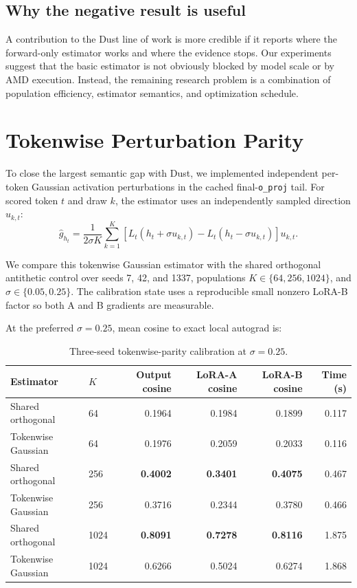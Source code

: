 \documentclass[11pt]{article}
\newcommand{\oproj}{\texttt{o\_proj}}
\begin{document}
\subsection{Why the negative result is useful}

A contribution to the Dust line of work is more credible if it reports where
the forward-only estimator works and where the evidence stops. Our experiments
suggest that the basic estimator is not obviously blocked by model scale or
by AMD execution. Instead, the remaining research problem is a combination of
population efficiency, estimator semantics, and optimization schedule.

\section{Tokenwise Perturbation Parity}

To close the largest semantic gap with Dust, we implemented independent
per-token Gaussian activation perturbations in the cached final-\oproj{} tail.
For scored token $t$ and draw $k$, the estimator uses an independently sampled
direction $u_{k,t}$:
\begin{equation}
\hat g_{h_t} =
\frac{1}{2\sigma K}
\sum_{k=1}^{K}
\left[
L_t(h_t+\sigma u_{k,t})-
L_t(h_t-\sigma u_{k,t})
\right]u_{k,t}.
\end{equation}

We compare this tokenwise Gaussian estimator with the shared orthogonal
antithetic control over seeds 7, 42, and 1337, populations
$K\in\{64,256,1024\}$, and $\sigma\in\{0.05,0.25\}$. The calibration
state uses a reproducible small nonzero LoRA-B factor so both A and B gradients
are measurable.

At the preferred $\sigma=0.25$, mean cosine to exact local autograd is:

\begin{table}[t]
\centering
\caption{Three-seed tokenwise-parity calibration at $\sigma=0.25$.}
\label{tab:tokenwise}
\begin{tabular}{llrrrr}
\toprule
Estimator & $K$ & Output cosine & LoRA-A cosine & LoRA-B cosine & Time (s) \\
\midrule
Shared orthogonal & 64   & 0.1964 & 0.1984 & 0.1899 & 0.117 \\
Tokenwise Gaussian & 64 & 0.1976 & 0.2059 & 0.2033 & 0.116 \\
Shared orthogonal & 256  & \textbf{0.4002} & \textbf{0.3401} & \textbf{0.4075} & 0.467 \\
Tokenwise Gaussian & 256 & 0.3716 & 0.2344 & 0.3780 & 0.466 \\
Shared orthogonal & 1024 & \textbf{0.8091} & \textbf{0.7278} & \textbf{0.8116} & 1.875 \\
Tokenwise Gaussian & 1024 & 0.6266 & 0.5024 & 0.6274 & 1.868 \\
\bottomrule
\end{tabular}
\end{table}
\end{document}

